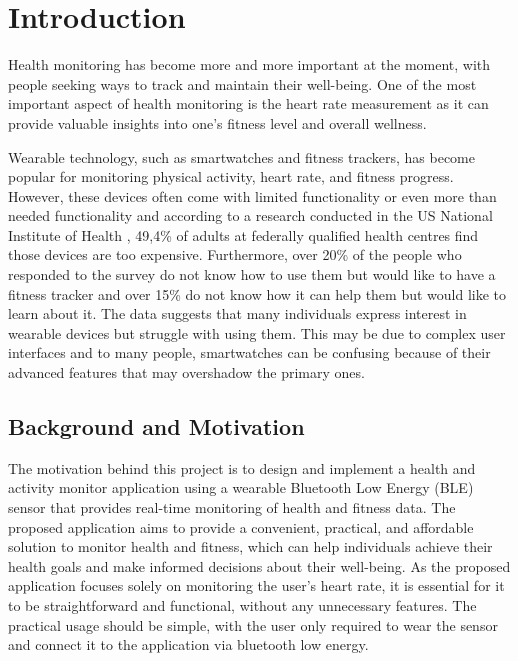 \chapter{Introduction}

Health monitoring has become more and more important at the moment, with people seeking ways to track and maintain their well-being. 
One of the most important aspect of health monitoring is the heart rate measurement as it can provide valuable insights into one's fitness level and overall wellness.

Wearable technology, such as smartwatches and fitness trackers, has become popular for monitoring physical activity, heart rate, and fitness progress.
However, these devices often come with limited functionality or even more than needed functionality and according to a research conducted in the US National Institute of Health \autocite{holko2022wearable}, 49,4\% of adults at federally qualified health centres find those devices are too expensive. 
Furthermore, over 20\% of the people who responded to the survey do not know how to use them but would like to have a fitness tracker and over 15\% do not know how it can help them but would like to learn about it. 
The data suggests that many individuals express interest in wearable devices but struggle with using them. 
This may be due to complex user interfaces and to many people, smartwatches can be confusing because of their advanced features that may overshadow the primary ones.


\section{Background and Motivation}
The motivation behind this project is to design and implement a health and activity monitor application using a wearable Bluetooth Low Energy (BLE) sensor that provides real-time monitoring of health and fitness data. 
The proposed application aims to provide a convenient, practical, and affordable solution to monitor health and fitness, which can help individuals achieve their health goals and make informed decisions about their well-being.
As the proposed application focuses solely on monitoring the user's heart rate, it is essential for it to be straightforward and functional, without any unnecessary features. 
The practical usage should be simple, with the user only required to wear the sensor and connect it to the application via bluetooth low energy.


